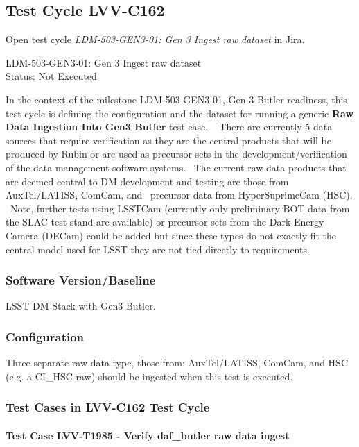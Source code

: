 \documentclass[DM,lsstdraft,STR,toc]{lsstdoc}
\begin{document}
\subsection{Test Cycle LVV-C162 }

Open test cycle {\it \href{https://jira.lsstcorp.org/secure/Tests.jspa#/testrun/LVV-C162}{LDM-503-GEN3-01: Gen 3 Ingest raw dataset}} in Jira.

LDM-503-GEN3-01: Gen 3 Ingest raw dataset\\
Status: Not Executed

In the context of the milestone LDM-503-GEN3-01, Gen 3 Butler readiness,
this test cycle is defining the configuration and the dataset for
running a generic \textbf{Raw Data Ingestion Into Gen3 Butler} test
case. ~ There are currently 5 data sources that require verification as
they are the central products that will be produced by Rubin or are used
as precursor sets in the development/verification of the data management
software systems. ~The current raw data products that are deemed central
to DM development and testing are those from AuxTel/LATISS, ComCam, and
~precursor data from HyperSuprimeCam (HSC). ~Note, further tests using
LSSTCam (currently only preliminary BOT data from the SLAC test stand
are available) or precursor sets from the Dark Energy Camera (DECam)
could be added but since these types do not exactly fit the central
model used for LSST they are not tied directly to requirements.

\subsubsection{Software Version/Baseline}
LSST DM Stack with Gen3 Butler.

\subsubsection{Configuration}
Three separate raw data type, those from: AuxTel/LATISS, ComCam, and HSC
(e.g. a CI\_HSC raw) should be ingested when this test is executed.

\subsubsection{Test Cases in LVV-C162 Test Cycle}

\paragraph{Test Case LVV-T1985 - Verify daf\_butler raw data ingest }\mbox{}\\
\end{document}
